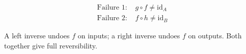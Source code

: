 \begin{remark*}
\[
\begin{aligned}
\text{Failure 1: } &g \circ f \ne \mathrm{id}_A \\
\text{Failure 2: } &f \circ h \ne \mathrm{id}_B
\end{aligned}
\]
\end{remark*}

\begin{remark*}[Interpretation]
A left inverse undoes $f$ on inputs; a right inverse undoes $f$ on outputs.
Both together give full reversibility.
\end{remark*}